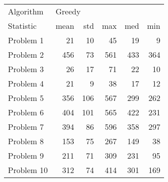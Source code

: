 \begin{tabular}{lrrrrr}
\toprule
Algorithm & \multicolumn{5}{l}{Greedy} \\
Statistic &   mean &  std &  max &  med &  min \\
\midrule
Problem 1  &     21 &   10 &   45 &   19 &    9 \\
Problem 2  &    456 &   73 &  561 &  433 &  364 \\
Problem 3  &     26 &   17 &   71 &   22 &   10 \\
Problem 4  &     21 &    9 &   38 &   17 &   12 \\
Problem 5  &    356 &  106 &  567 &  299 &  262 \\
Problem 6  &    404 &  101 &  565 &  422 &  231 \\
Problem 7  &    394 &   86 &  596 &  358 &  297 \\
Problem 8  &    153 &   75 &  267 &  149 &   38 \\
Problem 9  &    211 &   71 &  309 &  231 &   95 \\
Problem 10 &    312 &   74 &  414 &  301 &  169 \\
\bottomrule
\end{tabular}
